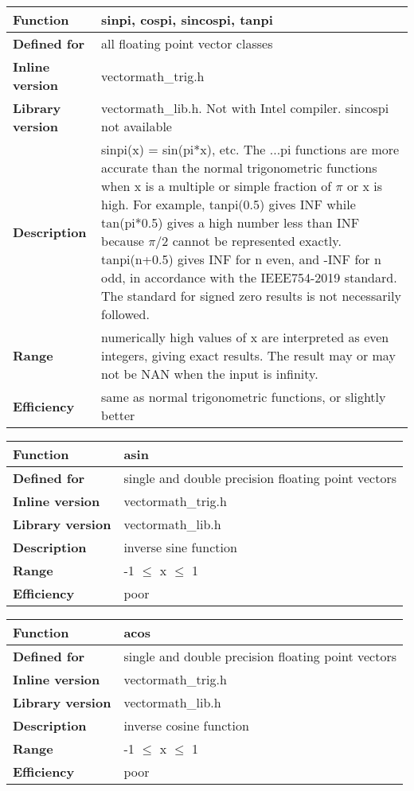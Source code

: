 \documentclass[vcl_manual.tex]{subfiles}
\begin{document}
\begin{tabular}{|p{30mm}|p{120mm}|}
\hline
\bfseries Function & sinpi, cospi, sincospi, tanpi \\ \hline
\bfseries Defined for & all floating point vector classes \\ \hline
\bfseries Inline version & vectormath\_trig.h \\ \hline
\bfseries Library version & vectormath\_lib.h. Not with Intel compiler. sincospi not available \\ \hline
\bfseries Description & sinpi(x) = sin(pi*x), etc. \newline
The ...pi functions are more accurate than the normal trigonometric functions when x is a multiple or simple fraction of $\pi$ or x is high. For example, tanpi(0.5) gives INF while tan(pi*0.5) gives a high number less than INF because $\pi/2$ cannot be represented exactly. tanpi(n+0.5) gives INF for n even, and -INF for n odd, in accordance with the IEEE754-2019 standard. The standard for signed zero results is not necessarily followed. \\ \hline
\bfseries Range & numerically high values of x are interpreted as even integers, giving exact results. The result may or may not be NAN when the input is infinity. \\ \hline
\bfseries Efficiency & same as normal trigonometric functions, or slightly better \\ \hline
\end{tabular}


\begin{tabular}{|p{30mm}|p{120mm}|}
\hline
\bfseries Function & asin \\ \hline
\bfseries Defined for & single and double precision floating point vectors \\ \hline
\bfseries Inline version & vectormath\_trig.h \\ \hline
\bfseries Library version & vectormath\_lib.h \\ \hline
\bfseries Description & inverse sine function \\ \hline
\bfseries Range & -1 $\leq$ x $\leq$ 1 \\ \hline
\bfseries Efficiency & poor \\ \hline
\end{tabular}


\begin{tabular}{|p{30mm}|p{120mm}|}
\hline
\bfseries Function & acos \\ \hline
\bfseries Defined for & single and double precision floating point vectors \\ \hline
\bfseries Inline version & vectormath\_trig.h \\ \hline
\bfseries Library version & vectormath\_lib.h \\ \hline
\bfseries Description & inverse cosine function \\ \hline
\bfseries Range & -1 $\leq$ x $\leq$ 1 \\ \hline
\bfseries Efficiency & poor \\ \hline
\end{tabular}
\end{document}
